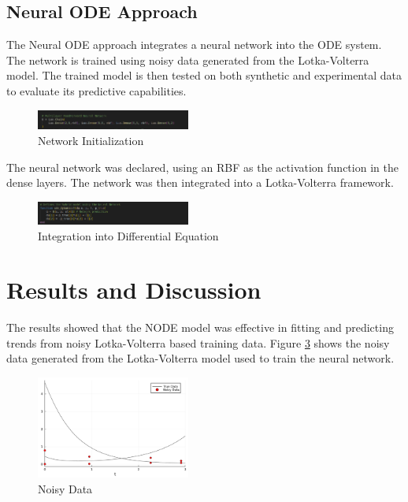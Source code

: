 \documentclass[twocolumn]{article}
\begin{document}
\subsection{Neural ODE Approach}
The Neural ODE approach integrates a neural network into the ODE system. The network is trained using noisy data generated from the Lotka-Volterra model. The trained model is then tested on both synthetic and experimental data to evaluate its predictive capabilities.

\begin{figure}[h]
    \centering
    \includegraphics[width=0.45\textwidth]{plots/Screenshot from 2024-08-01 00-20-22.png}
    \caption{Network Initialization}
    \label{fig:network_initialization}
\end{figure}

The neural network was declared, using an RBF as the activation function in the dense layers. The network was then integrated into a Lotka-Volterra framework.

\begin{figure}[h]
    \centering
    \includegraphics[width=0.45\textwidth]{plots/Screenshot from 2024-08-01 00-20-42.png}
    \caption{Integration into Differential Equation}
    \label{fig:integration}
\end{figure}

\section{Results and Discussion}
The results showed that the NODE model was effective in fitting and predicting trends from noisy Lotka-Volterra based training data. Figure \ref{fig:noisy_data} shows the noisy data generated from the Lotka-Volterra model used to train the neural network.

\begin{figure}[h]
    \centering
    \includegraphics[width=0.45\textwidth]{plots/Chemostat_noisydata.pdf}
    \caption{Noisy Data}
    \label{fig:noisy_data}
\end{figure}
\end{document}
